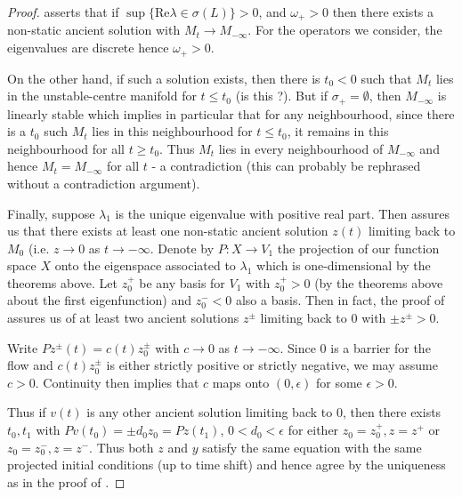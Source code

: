 \documentclass{amsart}
\begin{document}
\begin{proof}
\cite[Theorem 9.1.3]{lunardi2012analytic} asserts that if \(\sup \{\text{Re}\lambda \in \sigma(L)\} > 0\), and \(\omega_+ > 0\) then there exists a non-static ancient solution with \(M_t \to M_{-\infty}\). For the operators we consider, the eigenvalues are discrete hence \(\omega_+ > 0\).

On the other hand, if such a solution exists, then there is \(t_0 < 0\) such that \(M_t\) lies in the unstable-centre manifold for \(t \leq t_0\) (is this \cite[Theorem 9.1.4]{lunardi2012analytic}?). But if \(\sigma_+ = \emptyset\), then \(M_{-\infty}\) is linearly stable which implies in particular that for any neighbourhood, since there is a \(t_0\) such \(M_t\) lies in this neighbourhood for \(t \leq t_0\), it remains in this neighbourhood for all \(t \geq t_0\). Thus \(M_t\) lies in every neighbourhood of \(M_{-\infty}\) and hence \(M_t = M_{-\infty}\) for all \(t\) - a contradiction (this can probably be rephrased without a contradiction argument).

Finally, suppose \(\lambda_1\) is the unique eigenvalue with positive real part. Then \cite[Theorem 9.1.3]{lunardi2012analytic} assures us that there exists at least one non-static ancient solution \(z(t)\) limiting back to \(M_0\) (i.e. \(z \to 0\) as \(t \to -\infty\). Denote by \(P : X \to V_1\) the projection of our function space \(X\) onto the eigenspace associated to \(\lambda_1\) which is one-dimensional by the theorems above. Let \(z_0^+\) be any basis for \(V_1\) with \(z_0^+ > 0\) (by the theorems above about the first eigenfunction) and \(z_0^- < 0\) also a basis. Then in fact, the proof of \cite[Theorem 9.1.3]{lunardi2012analytic} assures us of at least two ancient solutions \(z^{\pm}\) limiting back to \(0\) with \(\pm z^{\pm} > 0\).

Write \(P z^{\pm}(t) = c(t) z_0^{\pm}\) with \(c \to 0\) as \(t \to -\infty\). Since \(0\) is a barrier for the flow and \(c(t) z_0^{\pm}\) is either strictly positive or strictly negative, we may assume \(c > 0\). Continuity then implies that \(c\) maps onto \((0, \epsilon)\) for some \(\epsilon > 0\).

Thus if \(v(t)\) is any other ancient solution limiting back to \(0\), then there exists \(t_0,t_1\) with \(P v(t_0) = \pm d_0 z_0 = P z(t_1)\), \(0 < d_0 < \epsilon\) for either \(z_0 = z_0^+, z = z^+\) or \(z_0 = z_0^-, z = z^-\). Thus both \(z\) and \(y\) satisfy the same equation with the same projected initial conditions (up to time shift) and hence agree by the uniqueness as in the proof of \cite[Theorem 9.1.3]{lunardi2012analytic}.
\end{proof}
\end{document}
